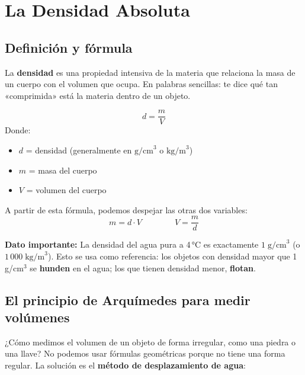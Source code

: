 \documentclass[12pt, letterpaper]{article}
\begin{document}

\section{La Densidad Absoluta}

\subsection{Definición y fórmula}

La \textbf{densidad} es una propiedad intensiva de la materia que relaciona la masa de un cuerpo con el volumen que ocupa. En palabras sencillas: te dice qué tan «comprimida» está la materia dentro de un objeto.

\begin{cuadroteoria}
  $$d = \frac{m}{V}$$
  Donde:
  \begin{itemize}[leftmargin=*]
    \item $d$ = densidad (generalmente en $\text{g/cm}^3$ o $\text{kg/m}^3$)
    \item $m$ = masa del cuerpo
    \item $V$ = volumen del cuerpo
  \end{itemize}
\end{cuadroteoria}

A partir de esta fórmula, podemos despejar las otras dos variables:
$$m = d \cdot V \qquad\qquad V = \frac{m}{d}$$

\begin{cuadroadvertencia}
  \textbf{Dato importante:} La densidad del agua pura a 4\,°C es exactamente $1\;\text{g/cm}^3$ (o $1\,000\;\text{kg/m}^3$). Esto se usa como referencia: los objetos con densidad mayor que 1\,g/cm$^3$ se \textbf{hunden} en el agua; los que tienen densidad menor, \textbf{flotan}.
\end{cuadroadvertencia}

\subsection{El principio de Arquímedes para medir volúmenes}

¿Cómo medimos el volumen de un objeto de forma irregular, como una piedra o una llave? No podemos usar fórmulas geométricas porque no tiene una forma regular. La solución es el \textbf{método de desplazamiento de agua}:
\end{document}

